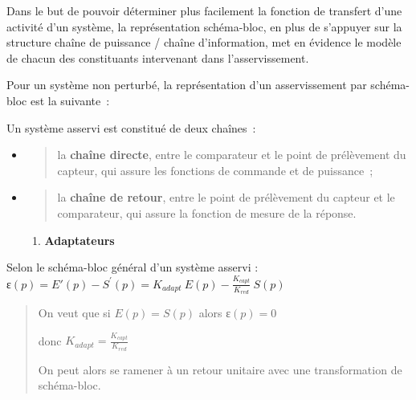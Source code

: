 Dans le but de pouvoir déterminer plus facilement la fonction de transfert d'une activité d'un système, la représentation schéma-bloc, en plus de s'appuyer sur la structure chaîne de puissance / chaîne d'information, met en évidence le modèle de chacun des constituants intervenant dans l'asservissement.

Pour un système non perturbé, la représentation d'un asservissement par schéma-bloc est la suivante~:

Un système asservi est constitué de deux chaînes~:

\begin{itemize}
\item
  \begin{quote}
  la \textbf{chaîne directe}, entre le comparateur et le point de prélèvement du capteur, qui assure les fonctions de commande et de puissance~;
  \end{quote}
\item
  \begin{quote}
  la \textbf{chaîne de retour}, entre le point de prélèvement du capteur et le comparateur, qui assure la fonction de mesure de la réponse.
  \end{quote}

  \begin{enumerate}
  \def\labelenumi{\arabic{enumi}.}
  \item
    \protect\hypertarget{mod-_Toc149497259}{}{}\textbf{Adaptateurs}
  \end{enumerate}
\end{itemize}

Selon le schéma-bloc général d'un système asservi : \(ɛ(p) = E'(p) - S^{'}(p) = K_{adapt}\ E(p) - \frac{K_{capt}}{K_{red}}\ S(p)\)

\begin{quote}
On veut que si \(E(p) = S(p)\) alors \(ɛ(p) = 0\)

donc \(K_{adapt} = \frac{K_{capt}}{K_{red}}\)

On peut alors se ramener à un retour unitaire avec une transformation de schéma-bloc.
\end{quote}

